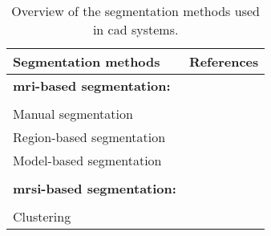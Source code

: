\begin{table}
  \caption{Overview of the segmentation methods used in \ac{cad} systems.}
  \scriptsize
  \centering
  \begin{tabular}{l r}
    \toprule
    \textbf{Segmentation methods} & \textbf{References} \\
    \midrule
    \textbf{\ac{mri}-based segmentation:} & \\ \\ [-1.5ex]
    \quad Manual segmentation & \cite{Artan2009,Artan2010,Matulewicz2013,Niaf2011,Niaf2012,Ozer2009,Ozer2010,Puech2009,Vos2008,Vos2008a,Vos2010,Vos2012,trigui2016classification,trigui2017automatic,lehaire2014computer} \\
    \quad Region-based segmentation & \cite{Litjens2012,Litjens2014,rampun2015classifying,rampun2015computer,rampun2016computer,rampun2016computerb,rampun2016quantitative} \\
    \quad Model-based segmentation & \cite{Litjens2011,Viswanath2008a,Viswanath2009,Viswanath2011,Vos2012,giannini2015fully} \\ \\ [-1.5ex]
    \textbf{\ac{mrsi}-based segmentation:} & \\ \\ [-1.5ex]
    \quad Clustering & \cite{Tiwari2009} \\
    \bottomrule
  \end{tabular}
\label{tab:summary-seg}
\end{table}
